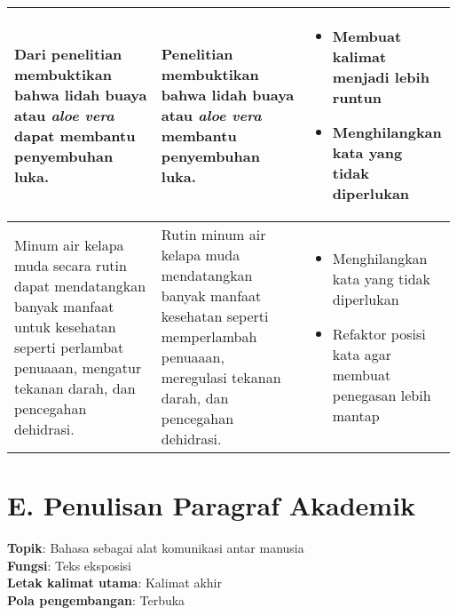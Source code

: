 \documentclass[
	10pt, %
	indonesian
]{assignment}
\begin{document}
\begin{center}
\begin{longtable}{ p{0.33\linewidth} | p{0.33\linewidth} | p{0.33\linewidth}}
		Dari penelitian membuktikan bahwa lidah buaya atau \textit{aloe vera} dapat membantu penyembuhan luka. &
		Penelitian membuktikan bahwa lidah buaya atau \textit{aloe vera} membantu penyembuhan luka.            &
		\begin{itemize}
			\item Membuat kalimat menjadi lebih runtun
			\item Menghilangkan kata yang tidak diperlukan
		\end{itemize}                                                                               \\

		\midrule

		Minum air kelapa muda secara rutin dapat mendatangkan banyak manfaat untuk
		kesehatan seperti perlambat penuaaan, mengatur tekanan darah, dan pencegahan dehidrasi.                &
		Rutin minum air kelapa muda mendatangkan banyak manfaat kesehatan
		seperti memperlambah penuaaan, meregulasi tekanan darah, dan pencegahan dehidrasi.                     &
		\begin{itemize}
			\item Menghilangkan kata yang tidak diperlukan
			\item Refaktor posisi kata agar membuat penegasan lebih mantap
		\end{itemize}                                                               \\

		\bottomrule
	\end{longtable}
\end{center}

\pagebreak
\section*{E. Penulisan Paragraf Akademik}

\textbf{Topik}: Bahasa sebagai alat komunikasi antar manusia\\
\textbf{Fungsi}: Teks eksposisi\\
\textbf{Letak kalimat utama}: Kalimat akhir\\
\textbf{Pola pengembangan}: Terbuka

\medskip
\end{document}
